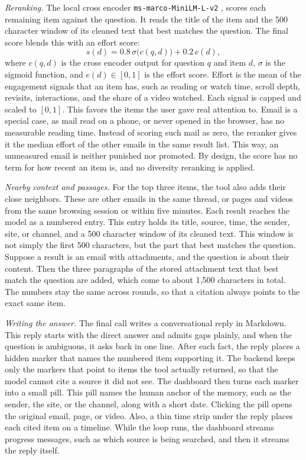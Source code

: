 \documentclass[conference]{IEEEtran}
\newcommand{\rerankmodel}{\texttt{ms\allowbreak-marco\allowbreak-MiniLM\allowbreak-L\allowbreak-6\allowbreak-v2}}
\begin{document}
\textit{Reranking.} The local cross encoder \rerankmodel{} \cite{b10}, \cite{b11} scores each remaining item against the question. It reads the title of the item and the 500 character window of its cleaned text that best matches the question. The final score blends this with an effort score:
\begin{equation}
s(d) = 0.8\,\sigma\big(c(q,d)\big) + 0.2\,e(d), \label{eq:final}
\end{equation}
where $c(q,d)$ is the cross encoder output for question $q$ and item $d$, $\sigma$ is the sigmoid function, and $e(d) \in [0,1]$ is the effort score. Effort is the mean of the engagement signals that an item has, such as reading or watch time, scroll depth, revisits, interactions, and the share of a video watched. Each signal is capped and scaled to $[0,1]$. This favors the items the user gave real attention to. Email is a special case, as mail read on a phone, or never opened in the browser, has no measurable reading time. Instead of scoring such mail as zero, the reranker gives it the median effort of the other emails in the same result list. This way, an unmeasured email is neither punished nor promoted. By design, the score has no term for how recent an item is, and no diversity reranking is applied.

\textit{Nearby context and passages.} For the top three items, the tool also adds their close neighbors. These are other emails in the same thread, or pages and videos from the same browsing session or within five minutes. Each result reaches the model as a numbered entry. This entry holds its title, source, time, the sender, site, or channel, and a 500 character window of its cleaned text. This window is not simply the first 500 characters, but the part that best matches the question. Suppose a result is an email with attachments, and the question is about their content. Then the three paragraphs of the stored attachment text that best match the question are added, which come to about 1,500 characters in total. The numbers stay the same across rounds, so that a citation always points to the exact same item.

\textit{Writing the answer.} The final call writes a conversational reply in Markdown. This reply starts with the direct answer and admits gaps plainly, and when the question is ambiguous, it asks back in one line. After each fact, the reply places a hidden marker that names the numbered item supporting it. The backend keeps only the markers that point to items the tool actually returned, so that the model cannot cite a source it did not see. The dashboard then turns each marker into a small pill. This pill names the human anchor of the memory, such as the sender, the site, or the channel, along with a short date. Clicking the pill opens the original email, page, or video. Also, a thin time strip under the reply places each cited item on a timeline. While the loop runs, the dashboard streams progress messages, such as which source is being searched, and then it streams the reply itself.
\end{document}
